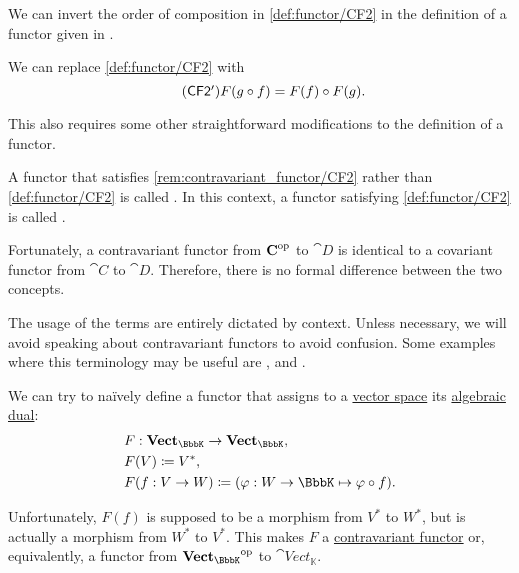 \begin{remark}\label{rem:contravariant_functor}
  We can invert the order of composition in \ref{def:functor/CF2} in the definition of a functor given in .
  \begin{thmenum}
     We can replace \ref{def:functor/CF2} with
    \begin{equation}\label{eq:rem:contravariant_functor/CF2}\tag{\logic{CF2\Textprime}}
      F(g \bincirc f) = F(f) \bincirc F(g).
    \end{equation}
  \end{thmenum}

  This also requires some other straightforward modifications to the definition of a functor.

  A functor that satisfies \ref{rem:contravariant_functor/CF2} rather than \ref{def:functor/CF2} is called . In this context, a functor satisfying \ref{def:functor/CF2} is called .

  Fortunately, a contravariant functor from \( \operatorname{\mathbf{C}}^{\operatorname{op}} \) to \( \cat{D} \) is identical to a covariant functor from \( \cat{C} \) to \( \cat{D} \). Therefore, there is no formal difference between the two concepts.

  The usage of the terms are entirely dictated by context. Unless necessary, we will avoid speaking about contravariant functors to avoid confusion. Some examples where this terminology may be useful are ,  and .
\end{remark}

\begin{example}\label{ex:dual_space_contravariant_functor}
  We can try to na\"ively define a functor that assigns to a \hyperref[def:vector_space]{vector space} its \hyperref[def:dual_vector_space]{algebraic dual}:
  \begin{equation*}
    \begin{aligned}
      &F: \cat{Vect_\BbbK} \to \cat{Vect_\BbbK}, \\
      &F(V) \coloneqq V^*, \\
      &F(f: V \to W) \coloneqq (\varphi: W \to \BbbK \mapsto \varphi \bincirc f).
    \end{aligned}
  \end{equation*}

  Unfortunately, \( F(f) \) is supposed to be a morphism from \( V^* \) to \( W^* \), but is actually a morphism from \( W^* \) to \( V^* \). This makes \( F \) a \hyperref[rem:contravariant_functor]{contravariant functor} or, equivalently, a functor from \( \cat{Vect_\BbbK}^{\opcat} \) to \( \cat{Vect_\BbbK} \).
\end{example}

